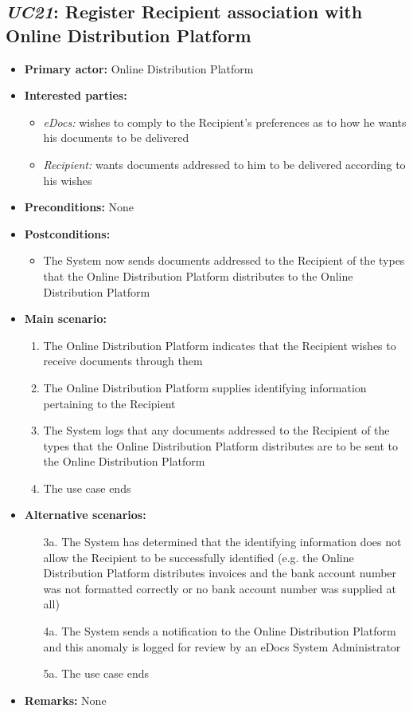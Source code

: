\documentclass[a4paper,10pt]{article}
\begin{document}
\subsection{\emph{UC21}: Register Recipient association with Online Distribution Platform}
\begin{itemize}
	\item \textbf{Primary actor:} Online Distribution Platform
	\item \textbf{Interested parties:} 
	\begin{itemize}
		\item \textit{eDocs:} wishes to comply to the Recipient's preferences as to how he wants his documents to be delivered
		\item \textit{Recipient:} wants documents addressed to him to be delivered according to his wishes
	\end{itemize}
	
	\item \textbf{Preconditions:}
	None
	
	\item \textbf{Postconditions:}
	\begin{itemize}
		\item The System now sends documents addressed to the Recipient of the types that the Online Distribution Platform distributes to the Online Distribution Platform
	\end{itemize}
	
	\item \textbf{Main scenario:} 
	\begin{enumerate}
		\item The Online Distribution Platform indicates that the Recipient wishes to receive documents through them
		\item The Online Distribution Platform supplies identifying information pertaining to the Recipient
		\item The System logs that any documents addressed to the Recipient of the types that the Online Distribution Platform distributes are to be sent to the Online Distribution Platform
		\item The use case ends
	\end{enumerate}
	
	\item \textbf{Alternative scenarios:} 
	\begin{enumerate}
		\item [3a.] The System has determined that the identifying information does not allow the Recipient to be successfully identified (e.g. the Online Distribution Platform distributes invoices and the bank account number was not formatted correctly or no bank account number was supplied at all)
		\item [4a.] The System sends a notification to the Online Distribution Platform and this anomaly is logged for review by an eDocs System Administrator
		\item [5a.] The use case ends
	\end{enumerate}
	
	\item \textbf{Remarks:}
	None
\end{itemize}
\end{document}
